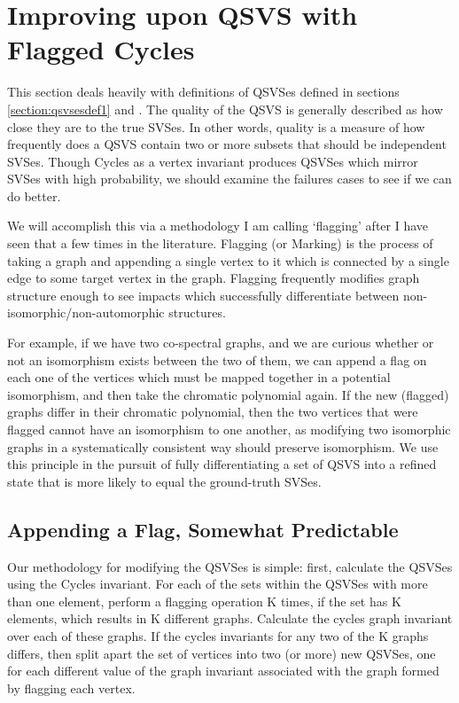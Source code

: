 \section{Improving upon QSVS with Flagged Cycles}

This section deals heavily with definitions of QSVSes defined in sections \ref{section:qsvsesdef1} and \label{section:qsvsesdef2}.
The quality of the QSVS is generally described as how close they are to the true SVSes.
In other words, quality is a measure of how frequently does a QSVS contain two or more subsets that should be independent SVSes.
Though Cycles as a vertex invariant produces QSVSes which mirror SVSes with high probability, we should examine the failures cases to see if we can do better.

We will accomplish this via a methodology I am calling `flagging' after I have seen that a few times in the literature.
Flagging (or Marking) is the process of taking a graph and appending a single vertex to it which is connected by a single edge to some target vertex in the graph.
Flagging frequently modifies graph structure enough to see impacts which successfully differentiate between non-isomorphic/non-automorphic structures.

For example, if we have two co-spectral graphs, and we are curious whether or not an isomorphism exists between the two of them, we can append a flag on each one of the vertices which must be mapped together in a potential isomorphism, and then take the chromatic polynomial again.
If the new (flagged) graphs differ in their chromatic polynomial, then the two vertices that were flagged cannot have an isomorphism to one another, as modifying two isomorphic graphs in a systematically consistent way should preserve isomorphism.
We use this principle in the pursuit of fully differentiating a set of QSVS into a refined state that is more likely to equal the ground-truth SVSes.

\subsection{Appending a Flag, Somewhat Predictable}

Our methodology for modifying the QSVSes is simple: first, calculate the QSVSes using the Cycles invariant.
For each of the sets within the QSVSes with more than one element, perform a flagging operation K times, if the set has K elements, which results in K different graphs.
Calculate the cycles graph invariant over each of these graphs.
If the cycles invariants for any two of the K graphs differs, then split apart the set of vertices into two (or more) new QSVSes, one for each different value of the graph invariant associated with the graph formed by flagging each vertex.

